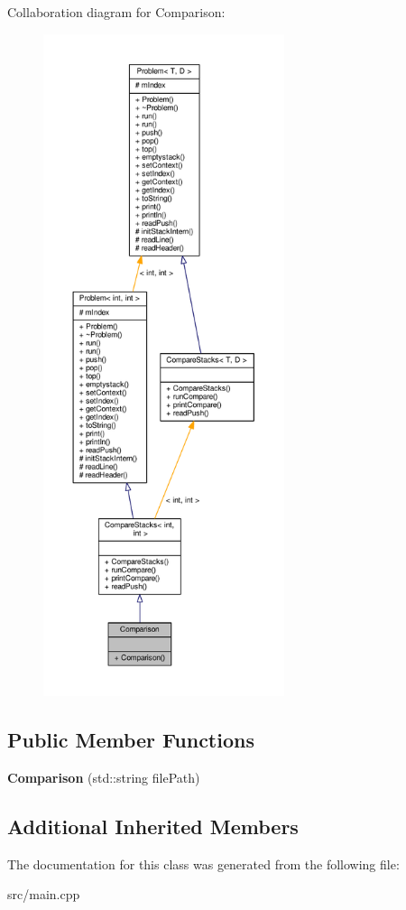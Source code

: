 Collaboration diagram for Comparison\+:
\nopagebreak
\begin{figure}[H]
\begin{center}
\leavevmode
\includegraphics[height=550pt]{class_comparison__coll__graph}
\end{center}
\end{figure}
\subsection*{Public Member Functions}
\begin{DoxyCompactItemize}
\item 
{\bfseries Comparison} (std\+::string file\+Path)\hypertarget{class_comparison_a24fad3f45a7c7c6bd53aaadf93fe2043}{}\label{class_comparison_a24fad3f45a7c7c6bd53aaadf93fe2043}

\end{DoxyCompactItemize}
\subsection*{Additional Inherited Members}


The documentation for this class was generated from the following file\+:\begin{DoxyCompactItemize}
\item 
src/main.\+cpp\end{DoxyCompactItemize}
